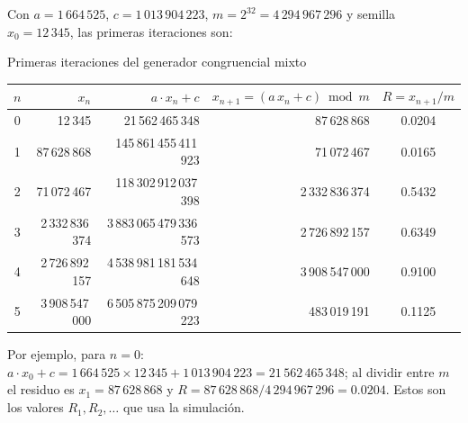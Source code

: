 Con $a = 1\,664\,525$, $c = 1\,013\,904\,223$, $m = 2^{32} = 4\,294\,967\,296$ y semilla $x_0 = 12\,345$, las primeras iteraciones son:

\begin{mitabla}{Primeras iteraciones del generador congruencial mixto}
\begin{tabular}{crrrc}
\toprule
$n$ & $x_n$ & $a \cdot x_n + c$ & $x_{n+1} = (a\,x_n + c) \bmod m$ & $R = x_{n+1}/m$ \\
\midrule
0 & 12\,345 & 21\,562\,465\,348 & 87\,628\,868 & 0.0204 \\
1 & 87\,628\,868 & 145\,861\,455\,411\,923 & 71\,072\,467 & 0.0165 \\
2 & 71\,072\,467 & 118\,302\,912\,037\,398 & 2\,332\,836\,374 & 0.5432 \\
3 & 2\,332\,836\,374 & 3\,883\,065\,479\,336\,573 & 2\,726\,892\,157 & 0.6349 \\
4 & 2\,726\,892\,157 & 4\,538\,981\,181\,534\,648 & 3\,908\,547\,000 & 0.9100 \\
5 & 3\,908\,547\,000 & 6\,505\,875\,209\,079\,223 & 483\,019\,191 & 0.1125 \\
\bottomrule
\end{tabular}
\end{mitabla}

Por ejemplo, para $n = 0$: $a \cdot x_0 + c = 1\,664\,525 \times 12\,345 + 1\,013\,904\,223 = 21\,562\,465\,348$; al dividir entre $m$ el residuo es $x_1 = 87\,628\,868$ y $R = 87\,628\,868 / 4\,294\,967\,296 = 0.0204$. Estos son los valores $R_1, R_2, \ldots$ que usa la simulación.

